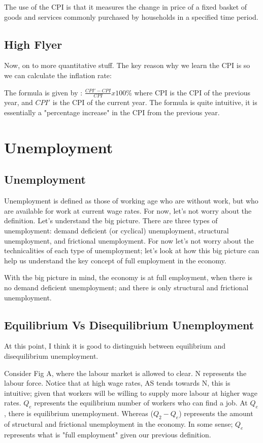 The use of the CPI is that it measures the change in price of a fixed basket of goods and services commonly purchased by households in a specified time period.
\subsection{High Flyer}
Now, on to more quantitative stuff. The key reason why we learn the CPI is so we can calculate the inflation rate:

The formula is given by : $\frac{CPI\prime-CPI}{CPI} x 100$\% where CPI is the CPI of the previous year, and $CPI\prime$ is the CPI of the current year.
The formula is quite intuitive, it is essentially a "percentage increase" in the CPI from the previous year.
\section{Unemployment}
\subsection{Unemployment}
Unemployment is defined as those of working age who are without work, but who are available for work at current wage rates. For now, let's not worry about the definition. Let's understand the big picture. There are three types of unemployment: demand deficient (or cyclical) unemployment, structural unemployment, and frictional unemployment. For now let's not worry about the technicalities of each type of unemployment; let's look at how this big picture can help us understand the key concept of full employment in the economy.

With the big picture in mind, the economy is at full employment, when there is no demand deficient unemployment; and there is only structural and frictional unemployment.
\subsection{Equilibrium Vs Disequilibrium Unemployment}
At this point, I think it is good to distinguish between equilibrium and disequilibrium unemployment.

Consider Fig A, where the labour market is allowed to clear. N represents the labour force. Notice that at high wage rates, AS tends towards N, this is intuitive; given that workers will be willing to supply more labour at higher wage rates. $Q_e$ represents the equilibrium number of workers who can find a job. At $Q_e$, there is equilibrium unemployment.  Whereas ($Q_2-Q_e$) represents the amount of structural and frictional unemployment in the economy. In some sense; $Q_e$ represents what is "full employment" given our previous definition.

